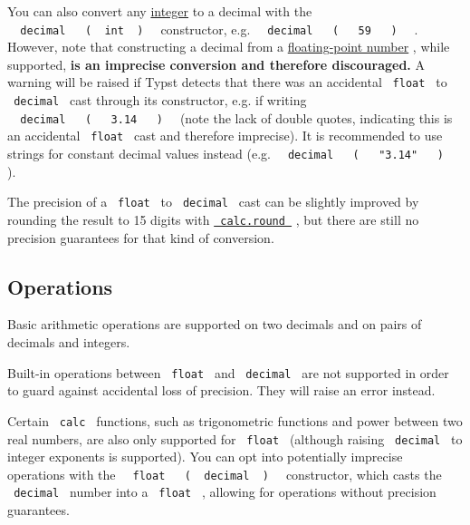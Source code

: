 You can also convert any
\href{/docs/reference/foundations/int/}{integer} to a decimal with the
\texttt{\ }{\texttt{\ decimal\ }}\texttt{\ }{\texttt{\ (\ }}\texttt{\ int\ }{\texttt{\ )\ }}\texttt{\ }
constructor, e.g.
\texttt{\ }{\texttt{\ decimal\ }}\texttt{\ }{\texttt{\ (\ }}\texttt{\ }{\texttt{\ 59\ }}\texttt{\ }{\texttt{\ )\ }}\texttt{\ }
. However, note that constructing a decimal from a
\href{/docs/reference/foundations/float/}{floating-point number} , while
supported, \textbf{is an imprecise conversion and therefore
discouraged.} A warning will be raised if Typst detects that there was
an accidental \texttt{\ float\ } to \texttt{\ decimal\ } cast through
its constructor, e.g. if writing
\texttt{\ }{\texttt{\ decimal\ }}\texttt{\ }{\texttt{\ (\ }}\texttt{\ }{\texttt{\ 3.14\ }}\texttt{\ }{\texttt{\ )\ }}\texttt{\ }
(note the lack of double quotes, indicating this is an accidental
\texttt{\ float\ } cast and therefore imprecise). It is recommended to
use strings for constant decimal values instead (e.g.
\texttt{\ }{\texttt{\ decimal\ }}\texttt{\ }{\texttt{\ (\ }}\texttt{\ }{\texttt{\ "3.14"\ }}\texttt{\ }{\texttt{\ )\ }}\texttt{\ }
).

The precision of a \texttt{\ float\ } to \texttt{\ decimal\ } cast can
be slightly improved by rounding the result to 15 digits with
\href{/docs/reference/foundations/calc/\#functions-round}{\texttt{\ calc.round\ }}
, but there are still no precision guarantees for that kind of
conversion.

\subsection{Operations}\label{operations}

Basic arithmetic operations are supported on two decimals and on pairs
of decimals and integers.

Built-in operations between \texttt{\ float\ } and \texttt{\ decimal\ }
are not supported in order to guard against accidental loss of
precision. They will raise an error instead.

Certain \texttt{\ calc\ } functions, such as trigonometric functions and
power between two real numbers, are also only supported for
\texttt{\ float\ } (although raising \texttt{\ decimal\ } to integer
exponents is supported). You can opt into potentially imprecise
operations with the
\texttt{\ }{\texttt{\ float\ }}\texttt{\ }{\texttt{\ (\ }}\texttt{\ decimal\ }{\texttt{\ )\ }}\texttt{\ }
constructor, which casts the \texttt{\ decimal\ } number into a
\texttt{\ float\ } , allowing for operations without precision
guarantees.

